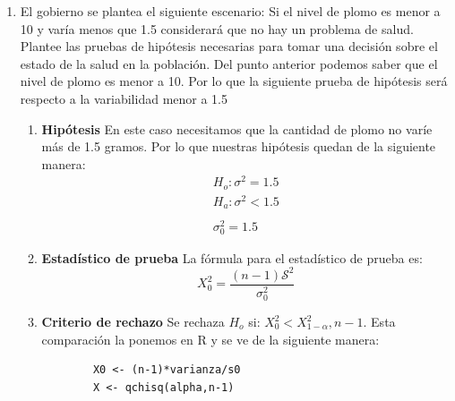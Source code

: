 \documentclass[12pt,a4paper]{article}
\begin{document}
\begin{enumerate}
\begin{enumerate}
\begin{enumerate}
      \item \textbf{Estadístico de prueba}
      La fórmula para el estadístico de prueba es:
      \[
        t_0=\frac{\overline{X}-\mu_0}{\mathcal{S}/\sqrt{n}}
      \]
      
      \item \textbf{Criterio de rechazo}
      Se rechaza \(H_o\) si: \(t_0<-t_{\alpha},n-1\). Esta comparación la ponemos en R y se ve de la siguiente manera:
      \begin{lstlisting}
        t0 <- (media-u0)/(sqrt(varianza/n))
        t <- -qt(1-alpha,n-1)
      \end{lstlisting}

      Los valores obtenidos son: \(t_0=0.478\) y \(t=1.6766\). Ahora nos hacemos la pregunta si \(t_0<t\). De acuerdo a los valores esto es cierto, por lo que se rechaza \(H_o\). Esto significa que hay evidencia estadística que indique que \(\mu<10\). Hay que considerar que el valor de alpha usado para este esta prueba de hipótesis fue de 0.05.
    \end{enumerate}


    \item El gobierno se plantea el siguiente escenario: Si el nivel de plomo es menor a 10 y varía menos que 1.5 considerará que no hay un problema de salud. Plantee las pruebas de hipótesis necesarias para tomar una decisión sobre el estado de la salud en la población. Del punto anterior podemos saber que el nivel de plomo es menor a 10. Por lo que la siguiente prueba de hipótesis será respecto a la variabilidad menor a 1.5
    \begin{enumerate}
      \item \textbf{Hipótesis}
      En este caso necesitamos que la cantidad de plomo no varíe más de 1.5 gramos. Por lo que nuestras hipótesis quedan de la siguiente manera:
      \[
        \begin{array}{c}
          H_o : \sigma^2 = 1.5 \\
          H_a : \sigma^2 < 1.5 \\
          \\
          \sigma^2_0 = 1.5
        \end{array}
      \]

      \item \textbf{Estadístico de prueba}
      La fórmula para el estadístico de prueba es:
      \[
        X^2_0=\frac{(n-1)\mathcal{S}^2}{\sigma^2_0}
      \]
      
      \item \textbf{Criterio de rechazo}
      Se rechaza \(H_o\) si: \(X^2_0<X^2_{1-\alpha},n-1\). Esta comparación la ponemos en R y se ve de la siguiente manera:
      \begin{lstlisting}
        X0 <- (n-1)*varianza/s0
        X <- qchisq(alpha,n-1)
      \end{lstlisting}


\end{enumerate}
\end{enumerate}
\end{enumerate}
\end{document}
